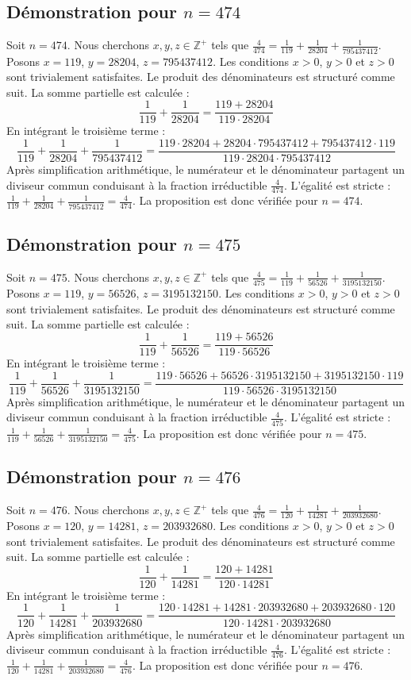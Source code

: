 \documentclass[11pt,a4paper]{article}
\begin{document}
\subsection{Démonstration pour $n = 474$}
Soit $n = 474$. Nous cherchons $x, y, z \in \mathbb{Z}^{+}$ tels que $\frac{4}{474} = \frac{1}{119} + \frac{1}{28204} + \frac{1}{795437412}$.
Posons $x = 119$, $y = 28204$, $z = 795437412$.
Les conditions $x > 0$, $y > 0$ et $z > 0$ sont trivialement satisfaites.
Le produit des dénominateurs est structuré comme suit. La somme partielle est calculée :
$$ \frac{1}{119} + \frac{1}{28204} = \frac{119+28204}{119 \cdot 28204} $$
En intégrant le troisième terme :
$$ \frac{1}{119} + \frac{1}{28204} + \frac{1}{795437412} = \frac{119 \cdot 28204 + 28204 \cdot 795437412 + 795437412 \cdot 119}{119 \cdot 28204 \cdot 795437412} $$
Après simplification arithmétique, le numérateur et le dénominateur partagent un diviseur commun conduisant à la fraction irréductible $\frac{4}{474}$.
L'égalité est stricte : $\frac{1}{119} + \frac{1}{28204} + \frac{1}{795437412} = \frac{4}{474}$.
La proposition est donc vérifiée pour $n = 474$.
\subsection{Démonstration pour $n = 475$}
Soit $n = 475$. Nous cherchons $x, y, z \in \mathbb{Z}^{+}$ tels que $\frac{4}{475} = \frac{1}{119} + \frac{1}{56526} + \frac{1}{3195132150}$.
Posons $x = 119$, $y = 56526$, $z = 3195132150$.
Les conditions $x > 0$, $y > 0$ et $z > 0$ sont trivialement satisfaites.
Le produit des dénominateurs est structuré comme suit. La somme partielle est calculée :
$$ \frac{1}{119} + \frac{1}{56526} = \frac{119+56526}{119 \cdot 56526} $$
En intégrant le troisième terme :
$$ \frac{1}{119} + \frac{1}{56526} + \frac{1}{3195132150} = \frac{119 \cdot 56526 + 56526 \cdot 3195132150 + 3195132150 \cdot 119}{119 \cdot 56526 \cdot 3195132150} $$
Après simplification arithmétique, le numérateur et le dénominateur partagent un diviseur commun conduisant à la fraction irréductible $\frac{4}{475}$.
L'égalité est stricte : $\frac{1}{119} + \frac{1}{56526} + \frac{1}{3195132150} = \frac{4}{475}$.
La proposition est donc vérifiée pour $n = 475$.
\subsection{Démonstration pour $n = 476$}
Soit $n = 476$. Nous cherchons $x, y, z \in \mathbb{Z}^{+}$ tels que $\frac{4}{476} = \frac{1}{120} + \frac{1}{14281} + \frac{1}{203932680}$.
Posons $x = 120$, $y = 14281$, $z = 203932680$.
Les conditions $x > 0$, $y > 0$ et $z > 0$ sont trivialement satisfaites.
Le produit des dénominateurs est structuré comme suit. La somme partielle est calculée :
$$ \frac{1}{120} + \frac{1}{14281} = \frac{120+14281}{120 \cdot 14281} $$
En intégrant le troisième terme :
$$ \frac{1}{120} + \frac{1}{14281} + \frac{1}{203932680} = \frac{120 \cdot 14281 + 14281 \cdot 203932680 + 203932680 \cdot 120}{120 \cdot 14281 \cdot 203932680} $$
Après simplification arithmétique, le numérateur et le dénominateur partagent un diviseur commun conduisant à la fraction irréductible $\frac{4}{476}$.
L'égalité est stricte : $\frac{1}{120} + \frac{1}{14281} + \frac{1}{203932680} = \frac{4}{476}$.
La proposition est donc vérifiée pour $n = 476$.
\end{document}
